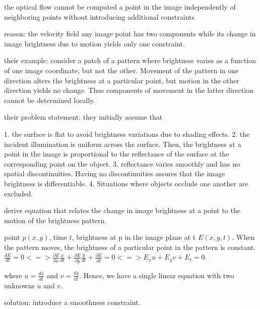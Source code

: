 the optical flow cannot be computed a point in the image independently of neighboring points without introducing additional constraints

reason: the velocity field any image point has two components while its change in image brightness due to motion yields only one constraint.

their example: consider a patch of a pattern where brightness varies as a function of one image coordinate, but not the other. Movement of the pattern in one direction alters the brightness at a particular point, but motion in the other direction yields no change. Thus components of movement in the latter direction cannot be determined locally.

their problem statement:
they initially assume that 

1. the surface is flat to avoid brightness variations due to shading effects.
2. the incident illumination is uniform across the surface. Then, the brightness at a point in the image is proportional to the reflectance of the surface at the corresponding point on the object.
3. reflectance varies smoothly and has no spatial discontinuities. Having no discontinuities assures that the image brightness is differentiable.
4. Situations where objects occlude one another are excluded.

derive equation that relates the change in image brightness at a point to the motion of the brightness pattern.

point $p(x,y)$, time $t$, brightness at p in the image plane at t $E(x,y,t)$.
When the pattern moves, the brightness of a particular point in the pattern is constant. 
$\frac{d E}{dt} = 0 <=> \frac{\partial E}{\partial x} \frac{x}{dt} + \frac{\partial E}{\partial y} \frac{y}{dt} + \frac{\partial E}{\partial t} = 0 <=> E_{x} u + E_{y} v + E_{t} = 0$.

where $u = \frac{dx}{dt}$ and $v = \frac{dy}{dt}$. Hence, we have a single linear equation with two unknowns $u$ and $v$.

solution: introduce a smoothness constraint.

